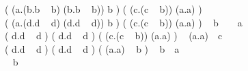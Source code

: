 
\Big(
    (\lambda a.(\lambda \textcolor{ffff77}b.\textcolor{ffff77}{b ~ b}) (\lambda \textcolor{ffff77}b.\textcolor{ffff77}{b ~ b})) b
\Big)
\Big(
    (\lambda c.(c ~ b)) (\lambda a.a)
\Big)
~
\overset
    {\alpha}
    \longrightarrow
\\

\Big(
    \textcolor{aaddaa}{(\lambda a.(\lambda d.d ~ d) (\lambda d.d ~ d))} \textcolor{ddaadd}b
\Big)
\Big(
    (\lambda c.(c ~ b)) (\lambda a.a)
\Big)
~
\underset
    {\textcolor{ddaadd}b ~ \mapsto ~ \textcolor{aaddaa}a}
    {
        \overset
            {\beta}
            \longrightarrow
    }
\\

\Big(
    \lambda d.d ~ d
\Big)
\Big(
    \lambda d.d ~ d
\Big)
\Big(
    \textcolor{aaddaa}{(\lambda c.(c ~ b))} \textcolor{ddaadd}{(\lambda a.a)}
\Big)
~
\underset
    {\textcolor{ddaadd}{(\lambda a.a)}~\mapsto~\textcolor{aaddaa}c}
    {
        \overset
            {\beta}
            \longrightarrow
    }
\\

\underset
    {\Omega}
    {
        \undergroup
            {
                \Big(
                    \lambda d.d ~ d
                \Big)
                \Big(
                    \lambda d.d ~ d
                \Big)
            }
    }
\Big(
    \textcolor{aaddaa}{(\lambda a.a)} ~ \textcolor{ddaadd}{b}
\Big)
~
\underset
    {\textcolor{ddaadd}{b}~\mapsto~\textcolor{aaddaa}{a}}
    {
        \overset
            {\beta}
            \longrightarrow
    }
\\

\Omega ~ b
\\

 ~ 